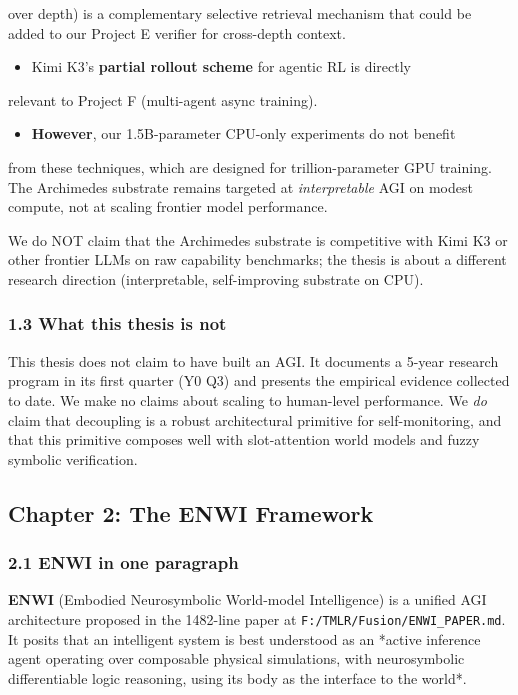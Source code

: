 \documentclass[11pt]{article}
\begin{document}
  over depth) is a complementary selective retrieval mechanism that
  could be added to our Project E verifier for cross-depth context.
\begin{itemize}
  \item Kimi K3's \textbf{partial rollout scheme} for agentic RL is directly
\end{itemize}

  relevant to Project F (multi-agent async training).
\begin{itemize}
  \item \textbf{However}, our 1.5B-parameter CPU-only experiments do not benefit
\end{itemize}

  from these techniques, which are designed for trillion-parameter
  GPU training. The Archimedes substrate remains targeted at
  \textit{interpretable} AGI on modest compute, not at scaling frontier
  model performance.

We do NOT claim that the Archimedes substrate is competitive with
Kimi K3 or other frontier LLMs on raw capability benchmarks; the
thesis is about a different research direction (interpretable,
self-improving substrate on CPU).

\hrulefill

\subsubsection{1.3 What this thesis is not}

This thesis does not claim to have built an AGI. It documents a 5-year research
program in its first quarter (Y0 Q3) and presents the empirical evidence collected
to date. We make no claims about scaling to human-level performance. We \textit{do} claim
that decoupling is a robust architectural primitive for self-monitoring, and that
this primitive composes well with slot-attention world models and fuzzy symbolic
verification.

\hrulefill

\subsection{Chapter 2: The ENWI Framework}

\subsubsection{2.1 ENWI in one paragraph}

\textbf{ENWI} (Embodied Neurosymbolic World-model Intelligence) is a unified AGI
architecture proposed in the 1482-line paper at \texttt{F:/TMLR/Fusion/ENWI\_PAPER.md}. It
posits that an intelligent system is best understood as an *active inference agent
operating over composable physical simulations, with neurosymbolic differentiable
logic reasoning, using its body as the interface to the world*.
\end{document}
